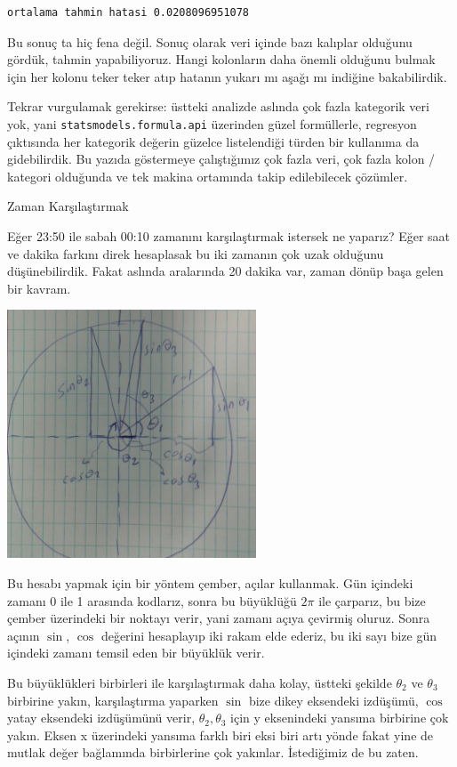 \documentclass[12pt,fleqn]{article}\usepackage{../../common}
\begin{document}
\begin{verbatim}
ortalama tahmin hatasi 0.0208096951078
\end{verbatim}

Bu sonuç ta hiç fena değil.  Sonuç olarak veri içinde bazı kalıplar
olduğunu gördük, tahmin yapabiliyoruz. Hangi kolonların daha önemli
olduğunu bulmak için her kolonu teker teker atıp hatanın yukarı mı aşağı mı
indiğine bakabilirdik.

Tekrar vurgulamak gerekirse: üstteki analizde aslında çok fazla kategorik
veri yok, yani \verb!statsmodels.formula.api! üzerinden güzel formüllerle,
regresyon çıktısında her kategorik değerin güzelce listelendiği türden bir
kullanıma da gidebilirdik. Bu yazıda göstermeye çalıştığımız çok fazla
veri, çok fazla kolon / kategori olduğunda ve tek makina ortamında takip
edilebilecek çözümler.

Zaman Karşılaştırmak

Eğer 23:50 ile sabah 00:10 zamanını karşılaştırmak istersek ne yaparız?
Eğer saat ve dakika farkını direk hesaplasak bu iki zamanın çok uzak
olduğunu düşünebilirdik. Fakat aslında aralarında 20 dakika var, zaman
dönüp başa gelen bir kavram. 

\includegraphics[width=20em]{stat_feat_01.png}

Bu hesabı yapmak için bir yöntem çember, açılar kullanmak. Gün içindeki
zamanı 0 ile 1 arasında kodlarız, sonra bu büyüklüğü $2\pi$ ile çarparız,
bu bize çember üzerindeki bir noktayı verir, yani zamanı açıya çevirmiş
oluruz. Sonra açının $\sin$, $\cos$ değerini hesaplayıp iki rakam elde
ederiz, bu iki sayı bize gün içindeki zamanı temsil eden bir büyüklük
verir.

Bu büyüklükleri birbirleri ile karşılaştırmak daha kolay, üstteki şekilde
$\theta_2$ ve $\theta_3$ birbirine yakın, karşılaştırma yaparken $\sin$
bize dikey eksendeki izdüşümü, $\cos$ yatay eksendeki izdüşümünü verir,
$\theta_2,\theta_3$ için y eksenindeki yansıma birbirine çok yakın. Eksen x
üzerindeki yansıma farklı biri eksi biri artı yönde fakat yine de mutlak
değer bağlamında birbirlerine çok yakınlar. İstediğimiz de bu zaten. 
\end{document}
